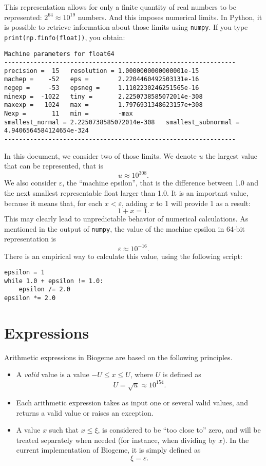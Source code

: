 \documentclass[12pt,a4paper]{article}
\begin{document}
This representation allows for only a finite quantity of real numbers to be represented: $2^{64} \approx 10^{19}$ numbers. And this imposes numerical limits. In Python, it is possible to retrieve information about those limits using \lstinline+numpy+. If you type \lstinline+print(np.finfo(float))+, you obtain:
\begin{lstlisting}
Machine parameters for float64
---------------------------------------------------------------
precision =  15   resolution = 1.0000000000000001e-15
machep =    -52   eps =        2.2204460492503131e-16
negep =     -53   epsneg =     1.1102230246251565e-16
minexp =  -1022   tiny =       2.2250738585072014e-308
maxexp =   1024   max =        1.7976931348623157e+308
Nexp =       11   min =        -max
smallest_normal = 2.2250738585072014e-308   smallest_subnormal = 4.9406564584124654e-324
---------------------------------------------------------------  
\end{lstlisting}

In this document, we consider two of those limits. We denote $u$ the largest value that can be represented, that is
\[
u \approx 10^{308}.
\]
We also consider $\varepsilon$, the ``machine epsilon'', that is the difference between 1.0 and the next smallest representable float larger than 1.0. It is an important value, because it means that, for each $x < \varepsilon$, adding $x$ to 1 will provide 1 as a result:
\[
1 + x = 1.
\]
This may clearly lead to unpredictable behavior of numerical calculations. As mentioned in the output of \lstinline+numpy+, the value of the machine epsilon in 64-bit representation is
\[
\varepsilon \approx 10^{-16}.
\]
There is an empirical way to calculate this value, using the following script:
\begin{lstlisting}
epsilon = 1
while 1.0 + epsilon != 1.0:
    epsilon /= 2.0
epsilon *= 2.0
\end{lstlisting}

\section{Expressions}

Arithmetic expressions in Biogeme are based on the following principles.
\begin{itemize}
\item A \emph{valid} value is a value $-U \leq x \leq U$, where $U$ is defined as
  \begin{equation}
    U = \sqrt{u} \approx 10^{154}.
  \end{equation}
\item Each arithmetic expression takes as input one or several valid values, and returns a valid value or raises an exception.
\item A value $x$ such that $x \leq \xi$,  is considered to be ``too close to'' zero, and will be treated separately when needed (for instance, when dividing by $x$). In the current implementation of Biogeme, it is simply  defined as
  \[
  \xi = \varepsilon.
  \]
\end{itemize}
\end{document}
